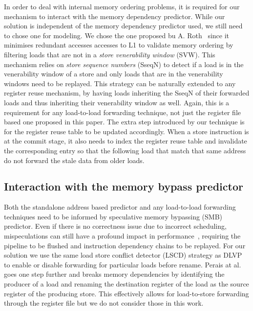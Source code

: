 \documentclass{sig-alternate}
\begin{document}
In order to deal with internal memory ordering problems, it is required for our mechanism to interact with the memory dependency predictor. While our solution is independent of the memory dependency predictor used, we still need to chose one for modeling. We chose the one proposed bu A. Roth~\cite{} since it minimises redundant accesses accesses to L1 to validate memory ordering by filtering loads that are not in a \textit{store venerability window} (SVW). This mechanism relies on \textit{store sequence numbers} (SseqN) to detect if a load is in the venerability window of a store and only loads that are in the venerability windows need to be replayed. This strategy can be naturally extended to any register reuse mechanism, by having loads inheriting the SseqN of their forwarded loads and thus inheriting their venerability window as well. %
Again, this is a requirement for any load-to-load forwarding technique, not just the register file based one proposed in this paper. The extra step introduced by our technique is for the register reuse table to be updated accordingly. When a store instruction is at the commit stage, it also needs to index the register reuse table and invalidate the corresponding entry so that the following load that match that same address do not forward the stale data from older loads.



\subsection{Interaction with the memory bypass predictor}
Both the standalone address based predictor and any load-to-load forwarding techniques need to be informed by speculative memory bypassing (SMB) predictor. Even if there is no correctness issue due to incorrect scheduling, mispeculations can still have a profound impact in performance~\cite{}, requiring the pipeline to be flushed and instruction dependency chains to be replayed. For our solution we use the same load store conflict detector (LSCD) strategy as DLVP~\cite{} to enable or disable forwarding for particular loads before rename. Perais at al.~\cite{} goes one step further and breaks memory dependencies by identifying the producer of a load and renaming the destination register of the load as the source register of the producing store. This effectively allows for load-to-store forwarding through the register file but we do not consider those in this work.  
\end{document}
